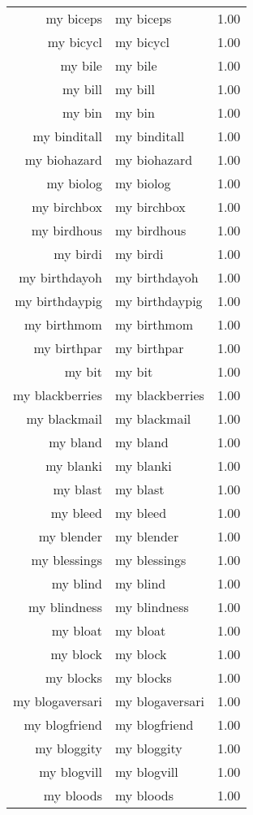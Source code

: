 \begin{table}[ht]
\begin{tabular}{rlr}
  my biceps & my biceps & 1.00 \\ 
  my bicycl & my bicycl & 1.00 \\ 
  my bile & my bile & 1.00 \\ 
  my bill & my bill & 1.00 \\ 
  my bin & my bin & 1.00 \\ 
  my binditall & my binditall & 1.00 \\ 
  my biohazard & my biohazard & 1.00 \\ 
  my biolog & my biolog & 1.00 \\ 
  my birchbox & my birchbox & 1.00 \\ 
  my birdhous & my birdhous & 1.00 \\ 
  my birdi & my birdi & 1.00 \\ 
  my birthdayoh & my birthdayoh & 1.00 \\ 
  my birthdaypig & my birthdaypig & 1.00 \\ 
  my birthmom & my birthmom & 1.00 \\ 
  my birthpar & my birthpar & 1.00 \\ 
  my bit & my bit & 1.00 \\ 
  my blackberries & my blackberries & 1.00 \\ 
  my blackmail & my blackmail & 1.00 \\ 
  my bland & my bland & 1.00 \\ 
  my blanki & my blanki & 1.00 \\ 
  my blast & my blast & 1.00 \\ 
  my bleed & my bleed & 1.00 \\ 
  my blender & my blender & 1.00 \\ 
  my blessings & my blessings & 1.00 \\ 
  my blind & my blind & 1.00 \\ 
  my blindness & my blindness & 1.00 \\ 
  my bloat & my bloat & 1.00 \\ 
  my block & my block & 1.00 \\ 
  my blocks & my blocks & 1.00 \\ 
  my blogaversari & my blogaversari & 1.00 \\ 
  my blogfriend & my blogfriend & 1.00 \\ 
  my bloggity & my bloggity & 1.00 \\ 
  my blogvill & my blogvill & 1.00 \\ 
  my bloods & my bloods & 1.00 \\ 

\end{tabular}
\end{table}
